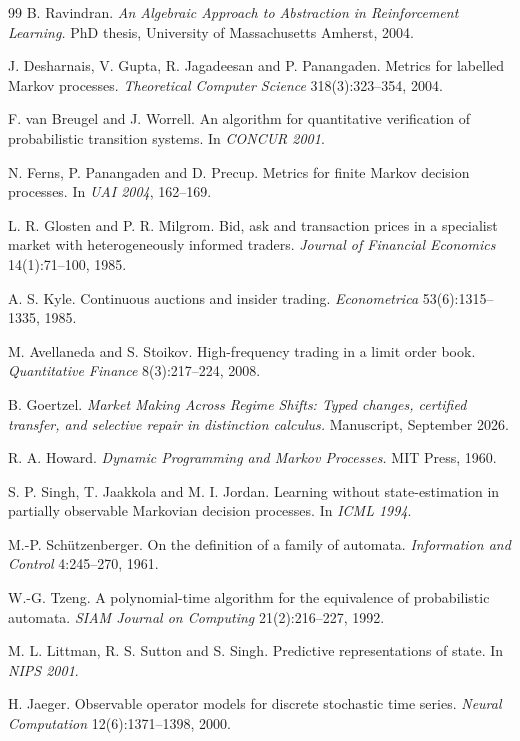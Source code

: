 \documentclass[11pt]{article}
\theoremstyle{definition}
\theoremstyle{plain}
\begin{document}
\begin{thebibliography}{99}
 B. Ravindran. \emph{An Algebraic Approach to Abstraction in Reinforcement
Learning.} PhD thesis, University of Massachusetts Amherst, 2004.

 J. Desharnais, V. Gupta, R. Jagadeesan and P. Panangaden. Metrics for labelled
Markov processes. \emph{Theoretical Computer Science} 318(3):323--354, 2004.

 F. van Breugel and J. Worrell. An algorithm for quantitative verification of
probabilistic transition systems. In \emph{CONCUR 2001}.

 N. Ferns, P. Panangaden and D. Precup. Metrics for finite Markov decision processes. In
\emph{UAI 2004}, 162--169.

 L. R. Glosten and P. R. Milgrom. Bid, ask and transaction prices in a specialist market
with heterogeneously informed traders. \emph{Journal of Financial Economics} 14(1):71--100, 1985.

 A. S. Kyle. Continuous auctions and insider trading. \emph{Econometrica}
53(6):1315--1335, 1985.

 M. Avellaneda and S. Stoikov. High-frequency trading in a limit order book.
\emph{Quantitative Finance} 8(3):217--224, 2008.

 B. Goertzel. \emph{Market Making Across Regime Shifts: Typed changes, certified
transfer, and selective repair in distinction calculus.} Manuscript, September 2026.

 R. A. Howard. \emph{Dynamic Programming and Markov Processes.} MIT Press, 1960.

 S. P. Singh, T. Jaakkola and M. I. Jordan. Learning without state-estimation in
partially observable Markovian decision processes. In \emph{ICML 1994}.

 M.-P. Sch\"utzenberger. On the definition of a family of automata.
\emph{Information and Control} 4:245--270, 1961.

 W.-G. Tzeng. A polynomial-time algorithm for the equivalence of probabilistic automata.
\emph{SIAM Journal on Computing} 21(2):216--227, 1992.

 M. L. Littman, R. S. Sutton and S. Singh. Predictive representations of state. In
\emph{NIPS 2001}.

 H. Jaeger. Observable operator models for discrete stochastic time series. \emph{Neural
Computation} 12(6):1371--1398, 2000.


\end{thebibliography}
\end{document}
